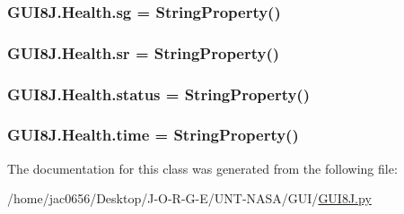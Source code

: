 \subsubsection[{\texorpdfstring{sg}{sg}}]{\setlength{\rightskip}{0pt plus 5cm}G\+U\+I8\+J.\+Health.\+sg = String\+Property()\hspace{0.3cm}{\ttfamily [static]}}\hypertarget{classGUI8J_1_1Health_a3fc10d8842d9f4ddc2765c0239802c4b}{}\label{classGUI8J_1_1Health_a3fc10d8842d9f4ddc2765c0239802c4b}
\subsubsection[{\texorpdfstring{sr}{sr}}]{\setlength{\rightskip}{0pt plus 5cm}G\+U\+I8\+J.\+Health.\+sr = String\+Property()\hspace{0.3cm}{\ttfamily [static]}}\hypertarget{classGUI8J_1_1Health_aff22cd911daa230907c1b365f7286e43}{}\label{classGUI8J_1_1Health_aff22cd911daa230907c1b365f7286e43}
\subsubsection[{\texorpdfstring{status}{status}}]{\setlength{\rightskip}{0pt plus 5cm}G\+U\+I8\+J.\+Health.\+status = String\+Property()\hspace{0.3cm}{\ttfamily [static]}}\hypertarget{classGUI8J_1_1Health_a28566a18c87f55e0b1e167becfcd7312}{}\label{classGUI8J_1_1Health_a28566a18c87f55e0b1e167becfcd7312}
\subsubsection[{\texorpdfstring{time}{time}}]{\setlength{\rightskip}{0pt plus 5cm}G\+U\+I8\+J.\+Health.\+time = String\+Property()\hspace{0.3cm}{\ttfamily [static]}}\hypertarget{classGUI8J_1_1Health_a9ba91a4c82d6eeaa9d337472eb34d196}{}\label{classGUI8J_1_1Health_a9ba91a4c82d6eeaa9d337472eb34d196}


The documentation for this class was generated from the following file\+:\begin{DoxyCompactItemize}
\item 
/home/jac0656/\+Desktop/\+J-\/\+O-\/\+R-\/\+G-\/\+E/\+U\+N\+T-\/\+N\+A\+S\+A/\+G\+U\+I/\hyperlink{GUI8J_8py}{G\+U\+I8\+J.\+py}\end{DoxyCompactItemize}
